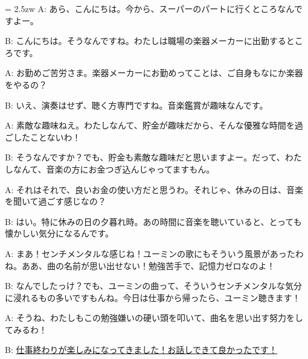 \documentclass[11pt]{amsart}
\title{}
\author{}
\newenvironment{hangall}[1]{\hangindent = 2.5zw\everypar{\hangindent = 2.5zw}}{}
\begin{document}
\maketitle
\begin{hangall}{}%
A: あら、こんにちは。今から、スーパーのパートに行くところなんですよー。

B: こんにちは。そうなんですね。わたしは職場の楽器メーカーに出勤するところです。

A: お勤めご苦労さま。楽器メーカーにお勤めってことは、ご自身もなにか楽器をやるの？

B: いえ、演奏はせず、聴く方専門ですね。音楽鑑賞が趣味なんです。

A: 素敵な趣味ねえ。わたしなんて、貯金が趣味だから、そんな優雅な時間を過ごしたことないわ！

B: そうなんですか？でも、貯金も素敵な趣味だと思いますよー。だって、わたしなんて、音楽の方にお金つぎ込んじゃってますもん。

A: それはそれで、良いお金の使い方だと思うわ。それじゃ、休みの日は、音楽を聞いて過ごす感じなの？

B: はい。特に休みの日の夕暮れ時。あの時間に音楽を聴いていると、とっても懐かしい気分になるんです。

A: まあ！センチメンタルな感じね！ユーミンの歌にもそういう風景があったわね。ああ、曲の名前が思い出せない！勉強苦手で、記憶力ゼロなのよ！

B: なんでしたっけ？でも、ユーミンの曲って、そういうセンチメンタルな気分に浸れるもの多いですもんね。今日は仕事から帰ったら、ユーミン聴きます！

A: そうね、わたしもこの勉強嫌いの硬い頭を叩いて、曲名を思い出す努力をしてみるわ！

B: \ul{仕事終わりが楽しみになってきました！お話しできて良かったです！}\end{hangall}
\end{document}
